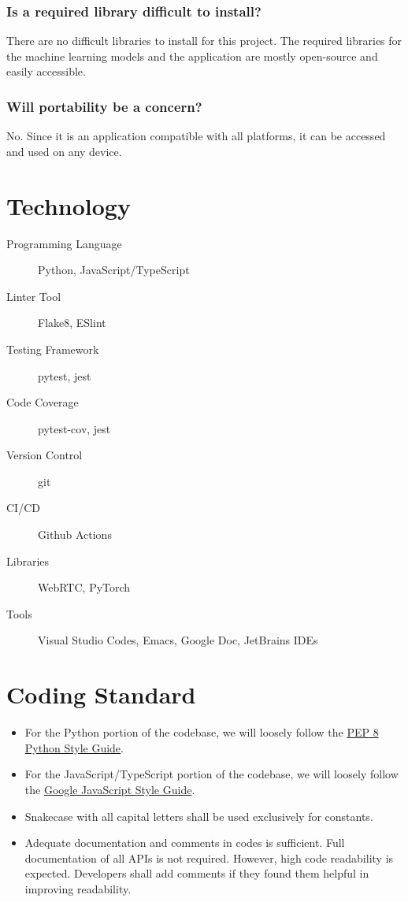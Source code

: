\documentclass{article}
\begin{document}
\subsubsection{Is a required library difficult to install?}

There are no difficult libraries to install for this project. The required
libraries for the machine learning models and the application are mostly
open-source and easily accessible.

\subsubsection{Will portability be a concern?}

No. Since it is an application compatible with all platforms, it can be accessed
and used on any device.

\section{Technology}

\begin{description}
\item[Programming Language] Python, JavaScript/TypeScript
\item[Linter Tool] Flake8, ESlint
\item[Testing Framework] pytest, jest
\item[Code Coverage] pytest-cov, jest
\item[Version Control] git
\item[CI/CD] Github Actions
\item[Libraries] WebRTC, PyTorch
\item[Tools] Visual Studio Codes, Emacs, Google Doc, JetBrains IDEs
\end{description}

\section{Coding Standard}

\begin{itemize}
\item For the Python portion of the codebase, we will loosely follow the
  \href{https://peps.python.org/pep-0008/}{PEP 8 Python Style Guide}.
\item For the JavaScript/TypeScript portion of the codebase, we will loosely follow
  the \href{https://google.github.io/styleguide/jsguide.html}{Google JavaScript
    Style Guide}.
\item Snakecase with all capital letters shall be used exclusively for constants.
\item Adequate documentation and comments in codes is sufficient. Full
  documentation of all APIs is not required. However, high code readability is
  expected. Developers shall add comments if they found them helpful in
  improving readability.
\end{itemize}
\end{document}
